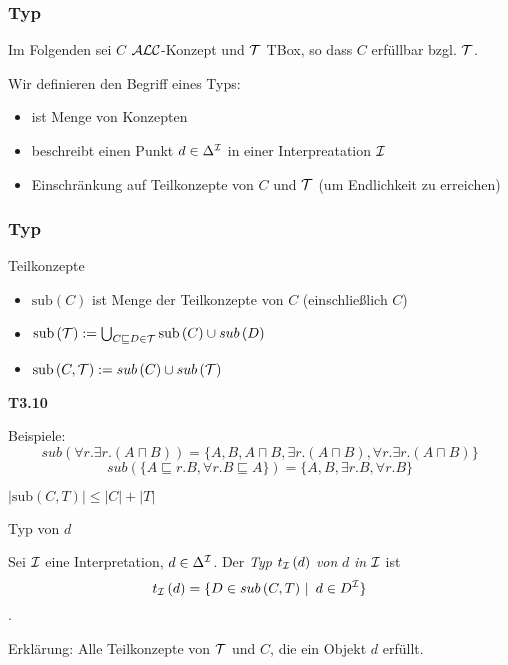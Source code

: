 \subsubsection{Typ}

Im Folgenden sei $C$ $\mathcal{A}\mathcal{L}\mathcal{C}$-Konzept und $\mathcal{T}$ TBox, so dass $C$ erfüllbar bzgl. $\mathcal{T}$.

Wir definieren den Begriff eines Typs:

\begin{itemize}
  \item ist Menge von Konzepten
  \item beschreibt einen Punkt $d \in \Delta^{\mathcal{I}}$ in einer Interpreatation $\mathcal{I}$
  \item Einschränkung auf Teilkonzepte von $C$ und $\mathcal{T}$ (um Endlichkeit zu erreichen)
\end{itemize}

\subsubsection{Typ}\label{typ}

\begin{definition}{Teilkonzepte}
\begin{itemize}
\item
  $\text{sub}\left( C \right)$ ist Menge der Teilkonzepte von $C$
  (einschließlich $C$)
\item
  $\text{sub}\left( \mathcal{T} \right) := \bigcup_{C \sqsubseteq D \in \mathcal{T}}^{}{\text{sub}\left( C \right) \cup sub\left( D \right)}$
\item
  $\text{sub}\left( C,\mathcal{T} \right) := sub\left( C \right) \cup sub\left( \mathcal{T} \right)$
\end{itemize}
\end{definition}

\textbf{T3.10}

Beispiele: $$sub(\forall r.\exists r.(A \sqcap B)) = \{A,B,A \sqcap B, \exists r.(A \sqcap B), \forall r.\exists r.(A \sqcap B)\}$$
$$sub(\{A \sqsubseteq r.B, \forall r.B \sqsubseteq A\}) = \{A,B, \exists r.B, \forall r.B\}$$

\begin{lemma}

$\left| \text{sub}\left( C,T \right) \right| \leq \left| C \right| + \left| T \right|$
\end{lemma}

\begin{definition}{Typ von $d$}

Sei $\mathcal{I}$ eine Interpretation, $d \in \Delta^{\mathcal{I}}$. Der \emph{Typ}
$t_{\mathcal{I}}\left( d \right)$ \emph{von} $d$ \emph{in} $\mathcal{I}$ ist
$$t_{\mathcal{I}}\left( d \right) = \left\{ D \in sub\left( C,T \right)\  \right|\ d \in D^{\mathcal{I}}\}$$.
\end{definition}
Erklärung: Alle Teilkonzepte von $\mathcal{T}$ und $C$, die ein Objekt $d$
erfüllt.


